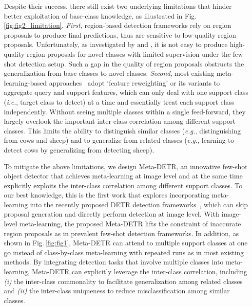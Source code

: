 \documentclass[letterpaper]{article} \usepackage{aaai22}  \usepackage{times}  \usepackage{helvet}  \usepackage{courier}  \usepackage[hyphens]{url}  \usepackage{graphicx} \urlstyle{rm} \def\UrlFont{\rm}  \usepackage{natbib}  \usepackage{caption} \DeclareCaptionStyle{ruled}{labelfont=normalfont,labelsep=colon,strut=off} \frenchspacing  \setlength{\pdfpagewidth}{8.5in}  \setlength{\pdfpageheight}{11in}  \usepackage{algorithm}
\begin{document}
Despite their success, there still exist two underlying limitations that hinder better exploitation of base-class knowledge, as illustrated in Fig.\,\ref{fig:fig2_limitation}.
\textit{First}, region-based detection frameworks rely on region proposals to produce final predictions, thus are sensitive to low-quality region proposals. Unfortunately, as investigated by \citet{fsod} and \citet{CoRPN}, it is not easy to produce high-quality region proposals for novel classes with limited supervision under the few-shot detection setup. Such a gap in the quality of region proposals obstructs the generalization from base classes to novel classes.
\textit{Second}, most existing meta-learning-based approaches~\citep{FewshotReweighting,metarcnn,fsod,FSDetView} adopt `feature reweighting' or its variants to aggregate query and support features, which can only deal with one support class (\textit{i.e.}, target class to detect) at a time and essentially treat each support class independently.
Without seeing multiple classes within a single feed-forward, they largely overlook the important inter-class correlation among different support classes. This limits the ability to distinguish similar classes (\textit{e.g.}, distinguishing from cows and sheep) and to generalize from related classes (\textit{e.g.}, learning to detect cows by generalizing from detecting sheep).

To mitigate the above limitations, we design Meta-DETR, an innovative few-shot object detector that achieves meta-learning at image level and at the same time explicitly exploits the inter-class correlation among different support classes. To our best knowledge, this is the first work that explores incorporating meta-learning into the recently proposed DETR detection frameworks~\citep{DETR,DeformableDETR}, which can skip proposal generation and directly perform detection at image level. With image-level meta-learning, the proposed Meta-DETR lifts the constraint of inaccurate region proposals as in prevalent few-shot detection frameworks. In addition, as shown in Fig.\,\ref{fig:fig1}, Meta-DETR can attend to multiple support classes at one go instead of class-by-class meta-learning with repeated runs as in most existing methods.
By integrating detection tasks that involve multiple classes into meta-learning, Meta-DETR can explicitly leverage the inter-class correlation, including \textit{(i)} the inter-class commonality to facilitate generalization among related classes and \textit{(ii)} the inter-class uniqueness to reduce misclassification among similar classes.
\end{document}
